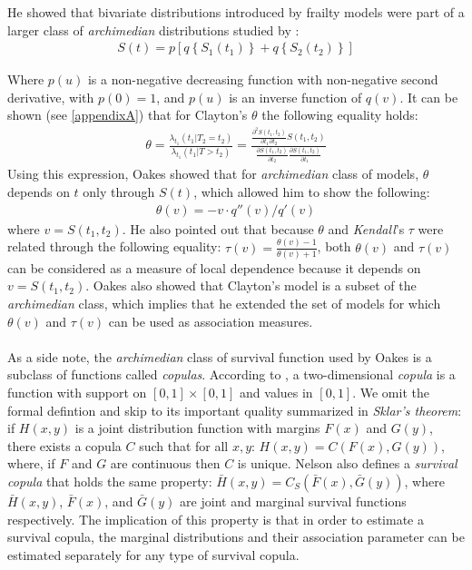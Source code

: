 \documentclass[]{article}
\begin{document}
He showed that bivariate distributions introduced by frailty models were part of a larger class of \emph{archimedian} distributions studied by \cite{genest1986copules}:
$$
\begin{aligned}
	S(t) = p\left[ q\left\{ S_1(t_1) \right\}  + q\left\{ S_2(t_2) \right\}  \right]
\end{aligned}
$$

Where $p(u)$ is a non-negative decreasing function with non-negative second derivative, with $p(0)=1$, and $p(u)$ is an inverse function of $q(v)$. It can be shown (see \ref{appendixA}) that for Clayton's $\theta$ the following equality holds:
	$$
	\begin{aligned}
		\theta = \frac{\lambda_{t_1}(t_1|T_2=t_2)}{\lambda_{t_1}(t_1|T>t_2)} = \frac{ \frac{\partial^2 S(t_1,t_2)}{\partial t_1 \partial t_2} S(t_1, t_2)}    {\frac{\partial S(t_1, t_2)}{\partial t_2} \frac{\partial S(t_1, t_2)}{\partial t_1}}
	\end{aligned}
	$$
Using this expression, Oakes showed that for \emph{archimedian} class of models, $\theta$ depends on $t$ only through $S(t)$, which allowed him to show the following:
$$
\begin{aligned}
\theta(v) = -v\cdot q''(v)/q'(v)
\end{aligned}
$$
where $v=S(t_1, t_2)$. He also pointed out that because $\theta$ and \emph{Kendall}'s $\tau$ were related through the following equality: $\tau(v) = \frac{\theta(v)-1}{\theta(v)+1}$, both $\theta(v)$ and $\tau(v)$ can be considered as a measure of local dependence because it depends on $v=S(t_1, t_2)$. Oakes also showed that Clayton's model is a subset of the \emph{archimedian} class, which implies that he extended the set of models for which $\theta(v)$ and $\tau(v)$ can be used as association measures.\\
~\\
As a side note, the \emph{archimedian} class of survival function used by Oakes is a subclass of functions called \emph{copulas}. According to \cite{nelsen2007introduction}, a two-dimensional \emph{copula} is a function with support on $[0, 1] \times [0, 1]$ and values in $[0, 1]$. We omit the formal defintion and skip to its important quality summarized in \emph{Sklar's theorem}: if $H(x,y)$ is a joint distribution function with margins $F(x)$ and $G(y)$, there exists a copula $C$ such that for all $x,y$: $H(x,y) = C(F(x), G(y))$, where, if $F$ and $G$ are continuous then $C$ is unique. Nelson also defines a \emph{survival copula} that holds the same property: $\bar{H}(x,y) = C_S(\bar{F}(x), \bar{G}(y))$, where $\bar{H}(x,y)$, $\bar{F}(x)$, and $\bar{G}(y)$ are joint and marginal survival functions respectively. The implication of this property is that in order to estimate a survival copula, the marginal distributions and their association parameter can be estimated separately for any type of survival copula. 
\end{document}

